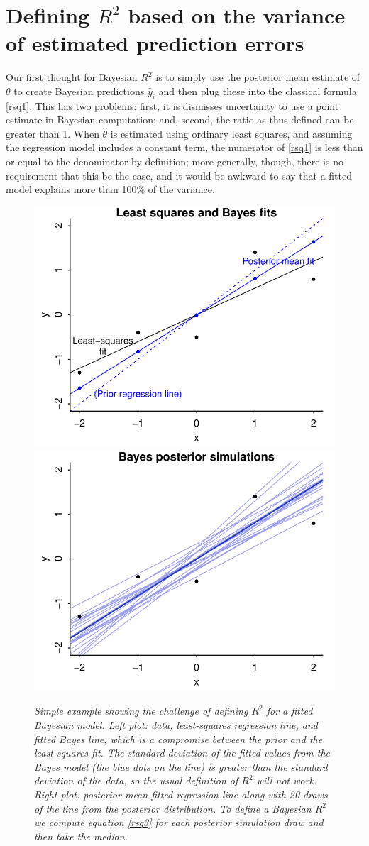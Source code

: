 \documentclass[11pt]{article}
\begin{document}
\section{Defining $R^2$ based on the variance of estimated prediction errors}

Our first thought for Bayesian $R^2$ is to simply use the posterior mean
estimate of $\theta$ to create Bayesian predictions $\hat{y}_i$ and then plug
these into the classical formula \eqref{rsq1}.  This has two problems:  first,
it is dismisses uncertainty to use a point estimate in Bayesian computation;
and, second, the ratio as thus defined can be greater than 1.  When
$\hat{\theta}$ is estimated using ordinary least squares, and assuming the
regression model includes a constant term, the numerator of \eqref{rsq1} is less
than or equal to the denominator by definition; more generally, though, there is
no requirement that this be the case, and it would be awkward to say that a
fitted model explains more than 100\% of the variance.

\begin{figure}
\centerline{\includegraphics[width=.5\textwidth]{fig/rsquared1a.pdf}\includegraphics[width=.5\textwidth]{fig/rsquared1b.pdf}}
\vspace{-.1in}
\caption{\em Simple example showing the challenge of defining $R^2$ for a fitted
Bayesian model.  {\em Left plot:}  data, least-squares regression line, and
fitted Bayes line, which is a compromise between the prior and the least-squares
fit.  The standard deviation of the fitted values from the Bayes model (the blue
dots on the line) is greater than the standard deviation of the data, so the
usual definition of $R^2$ will not work.  {\em Right plot:}  posterior mean
fitted regression line along with 20 draws of the line from the posterior
distribution.  To define a Bayesian $R^2$ we compute equation 
\eqref{rsq3} for each posterior simulation draw and then take the median.}
\label{rsquared1}
\end{figure}
\end{document}
